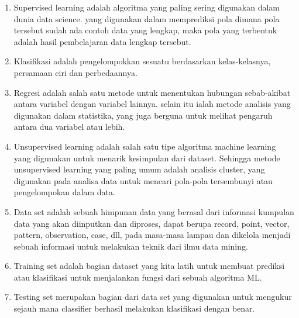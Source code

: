 \begin{enumerate}
    \item Supervised learning adalah algoritma yang paling sering digunakan dalam dunia data science. yang digunakan dalam memprediksi pola dimana pola tersebut sudah ada contoh data yang lengkap, maka pola yang terbentuk adalah hasil pembelajaran data lengkap tersebut.
    \item Klasiﬁkasi adalah pengelompokkan sesuatu berdasarkan kelas-kelasnya, persamaan ciri dan perbedaannya.
    \item Regresi adalah salah satu metode untuk menentukan hubungan sebab-akibat antara variabel dengan variabel lainnya. selain itu ialah metode analisis yang digunakan dalam statistika, yang juga berguna untuk melihat pengaruh antara dua variabel atau lebih.
    \item Unsupervised learning adalah salah satu tipe algoritma machine learning yang digunakan untuk menarik kesimpulan dari dataset. Sehingga metode unsupervised learning yang paling umum adalah analisis cluster, yang digunakan pada analisa data untuk mencari pola-pola tersembunyi atau pengelompokan dalam data.
    \item Data set adalah sebuah himpunan data yang berasal dari informasi kumpulan data yang akan diinputkan dan diproses, dapat berupa record, point, vector, pattern, observation, case, dll, pada masa-masa lampau dan dikelola menjadi sebuah informasi untuk melakukan teknik dari ilmu data mining.
    \item Training set adalah bagian dataset yang kita latih untuk membuat prediksi atau klasifikasi untuk menjalankan fungsi dari sebuah algoritma ML.
    \item Testing set merupakan bagian dari data set yang digunakan untuk mengukur sejauh mana classifier berhasil melakukan klasifikasi dengan benar.
\end{enumerate}

